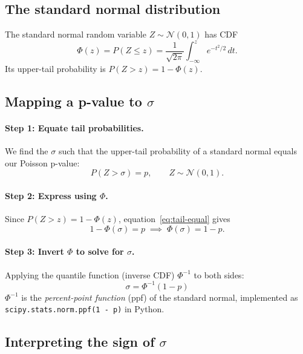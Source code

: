 \documentclass[12pt]{article}
\theoremstyle{definition}
\theoremstyle{remark}
\newcommand{\Prob}[1]{P\!\left(#1\right)}
\newcommand{\nsig}{\sigma}
\begin{document}
\subsection{The standard normal distribution}

The standard normal random variable $Z \sim \mathcal{N}(0,1)$ has CDF
\begin{equation}
  \Phi(z) = \Prob{Z \le z} = \frac{1}{\sqrt{2\pi}}\int_{-\infty}^{z}
  e^{-t^2/2}\,dt.
  \label{eq:phi}
\end{equation}
Its upper-tail probability is $\Prob{Z > z} = 1 - \Phi(z)$.

\subsection{Mapping a p-value to $\sigma$}

\paragraph{Step 1: Equate tail probabilities.}
We find the $\nsig$ such that the upper-tail probability of a standard
normal equals our Poisson p-value:
\begin{equation}
  \Prob{Z > \nsig} = p, \qquad Z \sim \mathcal{N}(0,1).
  \label{eq:tail-equal}
\end{equation}

\paragraph{Step 2: Express using $\Phi$.}
Since $\Prob{Z > z} = 1 - \Phi(z)$, equation~\eqref{eq:tail-equal}
gives
\begin{equation}
  1 - \Phi(\nsig) = p \;\implies\; \Phi(\nsig) = 1 - p.
  \label{eq:phi-eq}
\end{equation}

\paragraph{Step 3: Invert $\Phi$ to solve for $\nsig$.}
Applying the quantile function (inverse CDF) $\Phi^{-1}$ to both sides:
\begin{equation}
  \boxed{
    \nsig = \Phi^{-1}(1 - p)
  }
  \tag{7.3}
  \label{eq:sigma}
\end{equation}
$\Phi^{-1}$ is the \emph{percent-point function} (ppf) of the standard
normal, implemented as \texttt{scipy.stats.norm.ppf(1 - p)} in Python.

\subsection{Interpreting the sign of $\sigma$}
\end{document}

